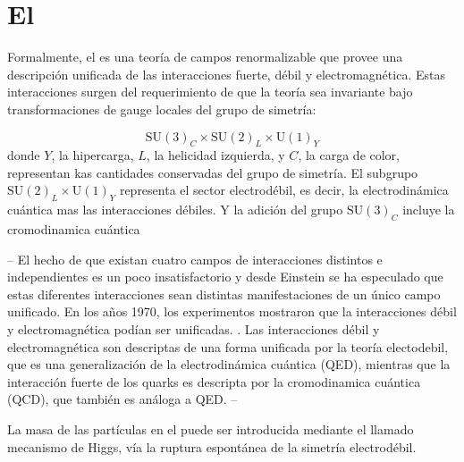 \section{El \SM}

Formalmente, el {\SM} es una teoría de campos renormalizable
que provee una descripción unificada de las interacciones
fuerte, débil y electromagnética. Estas interacciones surgen
del requerimiento de que la teoría sea invariante bajo
transformaciones de gauge locales del grupo de simetría:


\begin{equation}
  \text{SU}(3)_C \times \text{SU}(2)_L \times \text{U}(1)_Y
\end{equation}
%
donde $Y$, la hipercarga, $L$, la helicidad izquierda, y $C$, la carga de color, representan
kas cantidades conservadas del grupo de simetría. El subgrupo $\text{SU}(2)_L \times \text{U}(1)_Y$
representa el sector electrodébil, es decir, la electrodinámica cuántica mas las interacciones
débiles. Y la adición del grupo $\text{SU}(3)_C$ incluye la cromodinamica cuántica



--
El hecho de que existan cuatro campos de interacciones distintos
e independientes es un poco insatisfactorio y desde Einstein se
ha especulado que estas diferentes interacciones sean distintas
manifestaciones de un único campo unificado. En los a\~nos 1970,
los experimentos mostraron que la interacciones débil y
electromagnética podían ser unificadas. .
Las interacciones débil y electromagnética son descriptas de una
forma unificada por la teoría electodebil, que es una generalización de la electrodinámica cuántica (QED), mientras
que la interacción fuerte de los quarks es descripta por la cromodinamica cuántica (QCD), que
también es análoga a QED.
--




La masa de las part\'iculas en el {\SM} puede ser introducida mediante el llamado mecanismo
de Higgs\cite{PhysRevLett.13.321, PhysRevLett.13.508}, vía la ruptura espontánea de la simetría
electrodébil.

